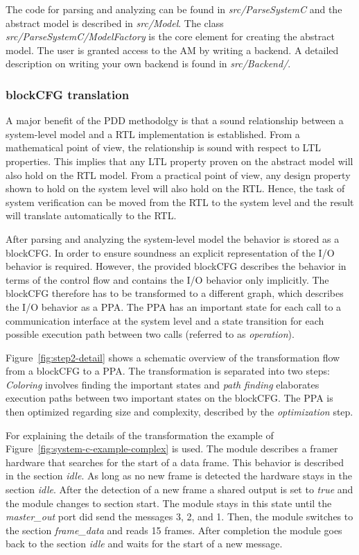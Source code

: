 The code for parsing and analyzing can be found in \textit{src/ParseSystemC} and the abstract model is described in \textit{src/Model}.  
The class \textit{src/ParseSystemC/ModelFactory} is the core element for creating the abstract model. 
The user is granted access to the AM by writing a backend.
A detailed description on writing your own backend is found in \textit{src/Backend/}. 

\subsubsection{blockCFG translation}

A major benefit of the PDD methodolgy is that a sound relationship between a system-level model and a RTL implementation is established. 
From a mathematical point of view, the relationship is sound with respect to LTL properties. This implies that any LTL property proven on the abstract model will also hold on the RTL model. 
From a practical point of view, any design property shown to hold on the system level will also hold on the RTL. 
Hence, the task of system verification can be moved from the RTL to the system level and the result will translate automatically to the RTL. 

After parsing and analyzing the system-level model the behavior is stored as a blockCFG.
In order to ensure soundness an explicit representation of the I/O behavior is required. However, the provided blockCFG describes the behavior in terms of the control flow and contains the I/O behavior only implicitly.
The blockCFG therefore has to be transformed to a different graph, which describes the I/O behavior as a PPA.
The PPA has an important state for each call to a communication interface at the system level and a state transition for each possible execution path between two calls (referred to as \textit{operation}).  

Figure~\ref{fig:step2-detail} shows a schematic overview of the transformation flow from a blockCFG to a PPA.
The transformation is separated into two steps: \textit{Coloring} involves finding the important states and \textit{path finding} elaborates execution paths between two important states on the blockCFG.
The PPA is then optimized regarding size and complexity, described by the \textit{optimization} step. 


For explaining the details of the transformation the example of Figure~\ref{fig:system-c-example-complex} is used. 
The module describes a framer hardware that searches for the start of a data frame. 
This behavior is described in the section \textit{idle}.
As long as no new frame is detected the hardware stays in the section \textit{idle}. 
After the detection of a new frame a shared output is set to \textit{true} and the module changes to section start. 
The module stays in this state until the \textit{master\_out} port did send the messages 3, 2, and 1. 
Then, the module switches to the section \textit{frame\_data} and reads 15 frames. 
After completion the module goes back to the section \textit{idle} and waits for the start of a new message. 


